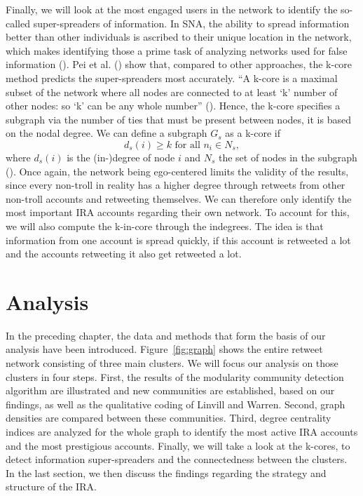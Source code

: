 \documentclass[12pt, titlepage=true, toc=bib]{scrartcl}
\begin{document}
Finally, we will look at the most engaged users in the network to identify the so-called super-spreaders of information. In SNA, the ability to spread information better than other individuals is ascribed to their unique location in the network, which makes identifying those a prime task of analyzing networks used for false information (\cite[1]{pei_searching_2015}). Pei et al. (\cite*{pei_searching_2015}) show that, compared to other approaches, the k-core method predicts the super-spreaders most accurately. \enquote{A k-core is a maximal subset of the network where all nodes are connected to at least \enquote{k} number of other nodes: so \enquote{k} can be any whole number} (\cite[983]{golovchenko_state_2018}). Hence, the k-core specifies a subgraph via the number of ties that must be present between nodes, it is based on the nodal degree. We can define a subgraph \( G_{s} \) as a k-core if \[ d_{s}(i) \geq k \text{ for all } n_{i} \in N_{s} ,\] where \( d_{s}(i) \) is the (in-)degree of node \( i \) and \( N_{s} \) the set of nodes in the subgraph (\cite[266]{wasserman_social_1994}). Once again, the network being ego-centered limits the validity of the results, since every non-troll in reality has a higher degree through retweets from other non-troll accounts and retweeting themselves. We can therefore only identify the most important IRA accounts regarding their own network. To account for this, we will also compute the k-in-core through the indegrees. The idea is that information from one account is spread quickly, if this account is retweeted a lot and the accounts retweeting it also get retweeted a lot.

\section{Analysis}

In the preceding chapter, the data and methods that form the basis of our analysis have been introduced. Figure~\ref{fig:graph} shows the entire retweet network consisting of three main clusters. We will focus our analysis on those clusters in four steps. First, the results of the modularity community detection algorithm are illustrated and new communities are established, based on our findings, as well as the qualitative coding of Linvill and Warren. Second, graph densities are compared between these communities. Third, degree centrality indices are analyzed for the whole graph to identify the most active IRA accounts and the most prestigious accounts. Finally, we will take a look at the k-cores, to detect information super-spreaders and the connectedness between the clusters. In the last section, we then discuss the findings regarding the strategy and structure of the IRA.
\end{document}
